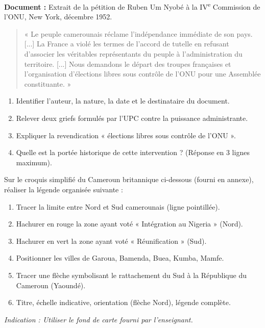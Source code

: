 \documentclass[11pt]{article}
\begin{document}
\begin{exercice}
\textbf{Document :} Extrait de la pétition de Ruben Um Nyobé à la IV\textsuperscript{e} Commission de l'ONU, New York, décembre 1952.
\begin{quote}
« Le peuple camerounais réclame l'indépendance immédiate de son pays. [...] La France a violé les termes de l'accord de tutelle en refusant d'associer les véritables représentants du peuple à l'administration du territoire. [...] Nous demandons le départ des troupes françaises et l'organisation d'élections libres sous contrôle de l'ONU pour une Assemblée constituante. »
\end{quote}
\begin{enumerate}
\item Identifier l'auteur, la nature, la date et le destinataire du document.
\item Relever deux griefs formulés par l'UPC contre la puissance administrante.
\item Expliquer la revendication « élections libres sous contrôle de l'ONU ».
\item Quelle est la portée historique de cette intervention ? (Réponse en 3 lignes maximum).
\end{enumerate}
\end{exercice}

\begin{exercice}
Sur le croquis simplifié du Cameroun britannique ci-dessous (fourni en annexe), réaliser la légende organisée suivante :
\begin{enumerate}
\item Tracer la limite entre Nord et Sud camerounais (ligne pointillée).
\item Hachurer en rouge la zone ayant voté « Intégration au Nigeria » (Nord).
\item Hachurer en vert la zone ayant voté « Réunification » (Sud).
\item Positionner les villes de Garoua, Bamenda, Buea, Kumba, Mamfe.
\item Tracer une flèche symbolisant le rattachement du Sud à la République du Cameroun (Yaoundé).
\item Titre, échelle indicative, orientation (flèche Nord), légende complète.
\end{enumerate}
\textit{Indication : Utiliser le fond de carte fourni par l'enseignant.}
\end{exercice}
\end{document}
